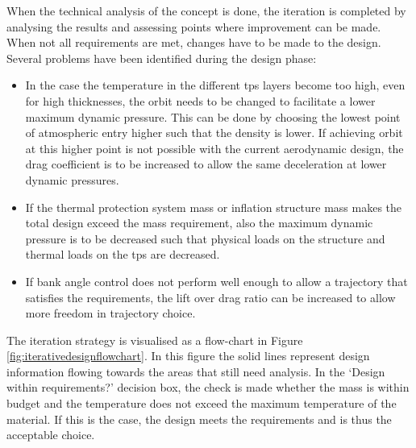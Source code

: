 When the technical analysis of the concept is done, the iteration is completed by analysing the results and assessing points where improvement can be made. When not all requirements are met, changes have to be made to the design. Several problems have been identified during the design phase:
\begin{itemize}
	\item In the case the temperature in the different \gls{tps} layers become too high, even for high thicknesses, the orbit needs to be changed to facilitate a lower maximum dynamic pressure. This can be done by choosing the lowest point of atmospheric entry higher such that the density is lower. If achieving orbit at this higher point is not possible with the current aerodynamic design, the drag coefficient is to be increased to allow the same deceleration at lower dynamic pressures.
	
	\item If the thermal protection system mass or inflation structure mass makes the total design exceed the mass requirement, also the maximum dynamic pressure is to be decreased such that physical loads on the structure and thermal loads on the \gls{tps} are decreased.
	
	\item If bank angle control does not perform well enough to allow a trajectory that satisfies the requirements, the lift over drag ratio can be increased to allow more freedom in trajectory choice.
	
	
\end{itemize}


The iteration strategy is visualised as a flow-chart in Figure \ref{fig:iterativedesignflowchart}. In this figure the solid lines represent design information flowing towards the areas that still need analysis. In the `Design within requirements?' decision box, the check is made whether the mass is within budget and the temperature does not exceed the maximum temperature of the material. If this is the case, the design meets the requirements and is thus the acceptable choice.

